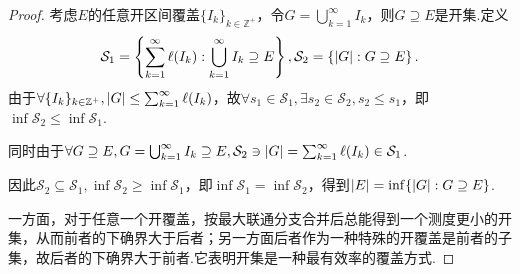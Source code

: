 \begin{proof}
    考虑\(E\)的任意开区间覆盖\(\{I_k\}_{k \in \mathbb{Z}^+}\)，令\(G=\bigcup_{k=1}^\infty I_k\)，则\(G \supseteq E\)是开集.定义
    \begin{align*}
        \mathcal{S}_1=\left\{\sum_{k=1}^\infty \ell(I_k): \bigcup_{k=1}^\infty I_k \supseteq E\right\},
        \mathcal{S}_2=\left\{\abs*{G}: G \supseteq E\right\}.
    \end{align*}
    由于\(\forall \{I_k\}_{k \in \mathbb{Z}^+}, \abs*{G} \leq \sum_{k=1}^\infty \ell(I_k)\)，故\(\forall s_1 \in \mathcal{S}_1, \exists s_2 \in \mathcal{S}_2, s_2 \leq s_1\)，即\(\inf \mathcal{S}_2 \leq \inf \mathcal{S}_1\).

    同时由于\(\forall G \supseteq E, G=\bigcup_{k=1}^\infty I_k \supseteq E, \mathcal{S}_2 \ni \abs*{G}=\sum_{k=1}^\infty \ell(I_k) \in \mathcal{S}_1\).

    因此\(\mathcal{S}_2 \subseteq \mathcal{S}_1, \inf \mathcal{S}_2 \geq \inf \mathcal{S}_1\)，即\(\inf \mathcal{S}_1=\inf \mathcal{S}_2\)，得到\(\abs*{E}=\inf\{\abs*{G}: G \supseteq E\}\).

    {\kaishu 一方面，对于任意一个开覆盖，按最大联通分支合并后总能得到一个测度更小的开集，从而前者的下确界大于后者；另一方面后者作为一种特殊的开覆盖是前者的子集，故后者的下确界大于前者.它表明开集是一种最有效率的覆盖方式.}
\end{proof}

\begin{comment}
    \begin{problem}[10]\label{2.A.10}
        证明：\(\abs*{[0,1] \setminus \mathbb{Q}}=1\).
    \end{problem}

    \begin{proof}
        \(\abs*{[0,1] \setminus \mathbb{Q}} \geq \abs*{[0,1]}-\abs*{\mathbb{Q}}=\abs*{[0,1]}=1\)且\(\abs*{[0,1] \setminus \mathbb{Q}} \leq \abs*{[0,1]}=1\)，
        得\(\abs*{[0,1] \setminus \mathbb{Q}}=1\).
    \end{proof}
\end{comment}

